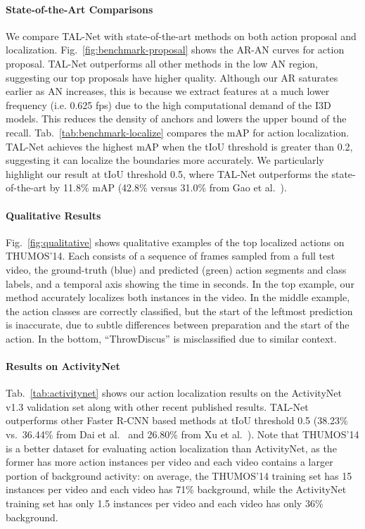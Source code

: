 \documentclass[10pt,twocolumn,letterpaper]{article}
\begin{document}
\vspace{-3mm}



\paragraph{State-of-the-Art Comparisons} We compare TAL-Net with
state-of-the-art methods on both action proposal and localization.
Fig.~\ref{fig:benchmark-proposal} shows the AR-AN curves for action proposal.
TAL-Net outperforms all other methods in the low AN region, suggesting our top
proposals have higher quality. Although our AR saturates earlier as AN
increases, this is because we extract features at a much lower frequency (i.e.
0.625 fps) due to the high computational demand of the I3D models. This reduces
the density of anchors and lowers the upper bound of the recall.
Tab.~\ref{tab:benchmark-localize} compares the mAP for action localization.
TAL-Net achieves the highest mAP when the tIoU threshold is greater than 0.2,
suggesting it can localize the boundaries more accurately. We particularly
highlight our result at tIoU threshold 0.5, where TAL-Net outperforms the
state-of-the-art by 11.8\% mAP (42.8\% versus 31.0\% from Gao et
al.~\cite{gao:bmvc2017}).

\vspace{-3mm}

\paragraph{Qualitative Results} Fig.~\ref{fig:qualitative} shows 
qualitative examples of the top localized actions on THUMOS'14.
Each
consists of a sequence of frames sampled from a full test video, the
ground-truth (blue) and predicted (green) action segments and class labels, and
a temporal axis showing the time in seconds. In the top example, our method
accurately localizes both
instances in the video. In the middle example, the action classes are correctly
classified, but the start of the leftmost prediction is inaccurate, due to
subtle differences between preparation and the start of the action.
In the bottom,
``ThrowDiscus'' is misclassified due to similar context.


\vspace{-3mm}

\paragraph{Results on ActivityNet} Tab.~\ref{tab:activitynet} shows our action
localization results on the ActivityNet v1.3 validation set along with other
recent published results. 
TAL-Net outperforms other Faster R-CNN based methods at tIoU threshold 0.5
(38.23\% vs.\ 36.44\% from Dai et al.~\cite{dai:iccv2017} and 26.80\% from Xu
et al.~\cite{xu:iccv2017}). Note that THUMOS'14 is a better dataset for
evaluating action localization than ActivityNet, as the former has more action
instances per video and each video contains a larger portion of background
activity: on average, the THUMOS'14 training set has 15 instances per video and
each video has 71\% background, while the ActivityNet training set has only 1.5
instances per video and each video has only 36\% background.
\end{document}
